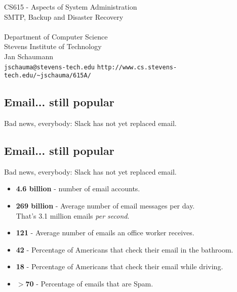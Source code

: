 \documentclass[xga]{xdvislides}
\begin{document}
\setfontphv

\lhead{\slidetitle}                               %
\cfoot{\relax}                               %
\rfoot{\Gray{\today}}

\newcommand{\smallish}{\fontsize{16}{16}\selectfont}

\vspace*{\fill}
\begin{center}
	\Hugesize
		CS615 - Aspects of System Administration\\ [1em]
		SMTP, Backup and Disaster Recovery \\ [1em]
	\hspace*{5mm}\blueline\\ [1em]
	\Normalsize
		Department of Computer Science\\
		Stevens Institute of Technology\\
		Jan Schaumann\\
		\verb+jschauma@stevens-tech.edu+
		\verb+http://www.cs.stevens-tech.edu/~jschauma/615A/+
\end{center}
\vspace*{\fill}

\subsection{Email... still popular}
Bad news, everybody: Slack has not yet replaced email.

\subsection{Email... still popular}
Bad news, everybody: Slack has not yet replaced email.
\\

\begin{itemize}
	\item {\bf 4.6 billion} - number of email accounts.
	\item {\bf 269 billion} - Average number of email messages per day. \\
		That's 3.1 million emails {\em per second}.
	\item {\bf 121} - Average number of emails an office worker receives.
	\item {\bf 42} - Percentage of Americans that check their email in the bathroom.
	\item {\bf 18} - Percentage of Americans that check their email while driving.
	\item {\bf $>$70} - Percentage of emails that are Spam.
\end{itemize}
\end{document}
